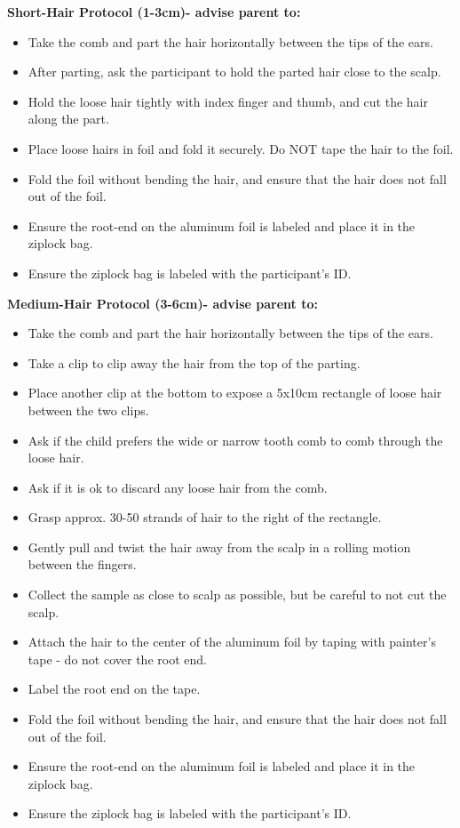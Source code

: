 \documentclass[]{book}
\providecommand{\tightlist}{%
  \setlength{\itemsep}{0pt}\setlength{\parskip}{0pt}}
\begin{document}
\textbf{Short-Hair Protocol (1-3cm)- advise parent to:}

\begin{itemize}
\tightlist
\item
  Take the comb and part the hair horizontally between the tips of the ears.
\item
  After parting, ask the participant to hold the parted hair close to the scalp.
\item
  Hold the loose hair tightly with index finger and thumb, and cut the hair along the part.
\item
  Place loose hairs in foil and fold it securely. Do NOT tape the hair to the foil.
\item
  Fold the foil without bending the hair, and ensure that the hair does not fall out of the foil.
\item
  Ensure the root-end on the aluminum foil is labeled and place it in the ziplock bag.
\item
  Ensure the ziplock bag is labeled with the participant's ID.
\end{itemize}

\textbf{Medium-Hair Protocol (3-6cm)- advise parent to:}

\begin{itemize}
\tightlist
\item
  Take the comb and part the hair horizontally between the tips of the ears.
\item
  Take a clip to clip away the hair from the top of the parting.
\item
  Place another clip at the bottom to expose a 5x10cm rectangle of loose hair between the two clips.
\item
  Ask if the child prefers the wide or narrow tooth comb to comb through the loose hair.
\item
  Ask if it is ok to discard any loose hair from the comb.
\item
  Grasp approx. 30-50 strands of hair to the right of the rectangle.
\item
  Gently pull and twist the hair away from the scalp in a rolling motion between the fingers.
\item
  Collect the sample as close to scalp as possible, but be careful to not cut the scalp.
\item
  Attach the hair to the center of the aluminum foil by taping with painter's tape - do not cover the root end.
\item
  Label the root end on the tape.
\item
  Fold the foil without bending the hair, and ensure that the hair does not fall out of the foil.
\item
  Ensure the root-end on the aluminum foil is labeled and place it in the ziplock bag.
\item
  Ensure the ziplock bag is labeled with the participant's ID.
\end{itemize}
\end{document}
